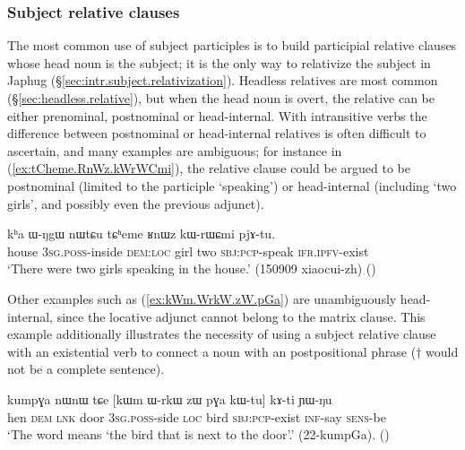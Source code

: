 \subsubsection{Subject relative clauses}  \label{sec:subject.participle.subject.relative}
The most common use of subject participles is to build participial relative clauses whose head noun is the subject; it is the only way to relativize the subject in Japhug (§\ref{sec:intr.subject.relativization}). Headless relatives are most common (§\ref{sec:headless.relative}), but when the head noun is overt, the relative can be either prenominal, postnominal or head-internal. With intransitive verbs the difference between postnominal or head-internal relatives is often difficult to ascertain, and many examples are ambiguous; for instance in (\ref{ex:tCheme.RnWz.kWrWCmi}), the relative clause could be argued to be postnominal (limited to the participle  `speaking') or head-internal (including  `two girls', and possibly even the previous adjunct).

\begin{exe}
\ex \label{ex:tCheme.RnWz.kWrWCmi}
 \gll  kʰa ɯ-ŋgɯ nɯtɕu tɕʰeme ʁnɯz kɯ-rɯɕmi pjɤ-tu. \\
 house \textsc{3sg}.\textsc{poss}-inside \textsc{dem}:\textsc{loc} girl two \textsc{sbj}:\textsc{pcp}-speak \textsc{ifr}.\textsc{ipfv}-exist \\
\glt  `There were two girls speaking in the house.' (150909 xiaocui-zh)
()
\end{exe}

Other examples such as (\ref{ex:kWm.WrkW.zW.pGa}) are unambiguously head-internal, since the locative adjunct  cannot belong to the matrix clause. This example additionally illustrates the necessity of using a subject relative clause with an existential verb to connect a noun with an postpositional phrase ($\dagger$ would not be a complete sentence).

\begin{exe}
\ex \label{ex:kWm.WrkW.zW.pGa}
 \gll  kumpɣa nɯnɯ tɕe [kɯm ɯ-rkɯ zɯ pɣa kɯ-tu] kɤ-ti ɲɯ-ŋu  \\
 hen \textsc{dem} \textsc{lnk} door \textsc{3sg}.\textsc{poss}-side \textsc{loc} bird \textsc{sbj}:\textsc{pcp}-exist \textsc{inf}-say \textsc{sens}-be \\
 \glt `The word  means `the bird that is next to the door'.' (22-kumpGa). 
()
\end{exe}


